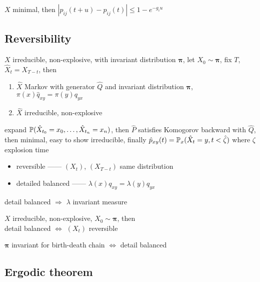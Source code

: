 \begin{lemma}
    $X$ minimal, then $|p_{ij}(t + u) - p_{ij}(t)| \leq 1 - e^{-g_{i}u}$
\end{lemma}

\subsection{Reversibility}\label{subsec:reversibility}

\begin{thm}
    $X$ irreducible, non-explosive, with invariant distribution $\bm \pi$, let $X_0 \sim \bm \pi$, fix $T$, $\hat X_t = X_{T-t}$, then
    \begin{enumerate}
        \item $\hat X$ Markov with generator $\hat Q$ and invariant distribution $\bm \pi$, $\pi(x)\hat q_{xy} = \pi(y)q_{yx}$
        \item $\hat X$ irreducible, non-explosive
    \end{enumerate}
\end{thm}
\begin{pf}
    expand $\mathbb{P}(\hat X_{t_0} = x_0, \dots, \hat X_{t_n} = x_n)$, then $\hat P$ satisfies Komogorov backward with $\hat Q$, then minimal, easy to show irreducible,
    finally $\hat p_{xy}(t) = \mathbb{P}_x(\hat X_t = y, t < \hat \zeta)$ where $\zeta$ explosion time
\end{pf}

\begin{itemize}
    \item reversible ------ $(X_t)$, $(X_{T-t})$ same distribution
    \item detailed balanced ------ $\lambda(x)q_{xy} = \lambda(y)q_{yx}$
\end{itemize}

\begin{lemma}
    detail balanced $\Rightarrow$ $\lambda$ invariant measure
\end{lemma}

\begin{thm}
    $X$ irreducible, non-explosive, $X_0 \sim \bm \pi$, then\\
    detail balanced $\iff$ $(X_t)$ reversible
\end{thm}

\begin{lemma}
    $\bm \pi$ invariant for birth-death chain $\iff$ detail balanced
\end{lemma}

\subsection{Ergodic theorem}\label{subsec:ergodic-theorem}

